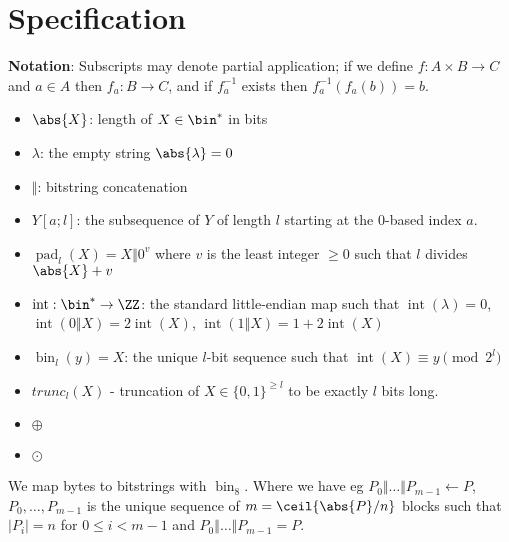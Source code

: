 \documentclass[letterpaper,11pt]{article}
\newcommand*{\parintro}[1]{\textbf{#1}:}
\newcommand*{\Concat}{\Vert}
\DeclareMathOperator{\fromint}{bin}
\DeclareMathOperator{\intify}{int}
\DeclareMathOperator{\pad}{pad}
\begin{document}
\section{Specification}
\parintro{Notation}
Subscripts may denote partial application; if we define $f: A \times B \rightarrow C$ and
$a \in A$ then $f_a: B \rightarrow C$, and if $f_a^{-1}$ exists then $f_a^{-1}(f_a(b)) = b$.
\begin{itemize}
    \item $\abs{X}$: length of $X \in \bin^{*}$ in bits
    \item $\lambda$: the empty string $\abs{\lambda} = 0$
    \item $\Concat$: bitstring concatenation
    \item $Y[a;l]$: the subsequence of $Y$ of length $l$ starting at the 0-based index $a$.
    \item $\pad_l(X) = X \Concat 0^v$
    where $v$ is the least integer $\geq 0$ such that $l$ divides $\abs{X} + v$
    \item $\intify: \bin^{*} \rightarrow \ZZ$: the
    standard little-endian map such that
    $\intify(\lambda) = 0$, $\intify(0 \Concat X) = 2\intify(X)$, $\intify(1 \Concat X) = 1 + 2\intify(X)$
    \item $\fromint_l(y) = X$: the unique
    $l$-bit sequence such that $\intify(X) \equiv y \pmod{2^l}$
    \item $trunc_l(X)$ - truncation of $X \in \{0,1\}^{\ge l}$ to be exactly $l$ bits long.
    \item \(\oplus\)
    \item \(\odot\)
\end{itemize}
We map bytes to bitstrings with \(\fromint_8\).
Where we have eg \(P_0 \Concat \ldots \Concat P_{m-1} \gets P\), 
\(P_0, \ldots, P_{m-1}\) is the unique sequence of \(m = \ceil{\abs{P}/n}\) blocks
such that \(|P_i| = n\) for \(0 \leq i < m-1\) and \(P_0 \Concat \ldots \Concat P_{m-1} = P\).
\end{document}
